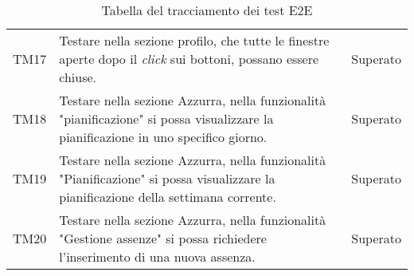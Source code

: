 \begin{table}[h]
\begin{tabularx}{\textwidth}{c X c}
		TM17 & Testare nella sezione profilo, che tutte le finestre aperte dopo il \emph{click} sui bottoni, possano essere chiuse. & Superato\\
		TM18 & Testare nella sezione Azzurra, nella funzionalità "pianificazione" si possa visualizzare la pianificazione in uno specifico giorno. & Superato\\
		TM19 & Testare nella sezione Azzurra, nella funzionalità "Pianificazione" si possa visualizzare la pianificazione della settimana corrente. & Superato\\
		TM20 & Testare nella sezione Azzurra, nella funzionalità "Gestione assenze" si possa richiedere l'inserimento di una nuova assenza. & Superato\\
		\hline
	\end{tabularx} \hbox{}
	\caption{Tabella del tracciamento dei test E2E}
\end{table}%

